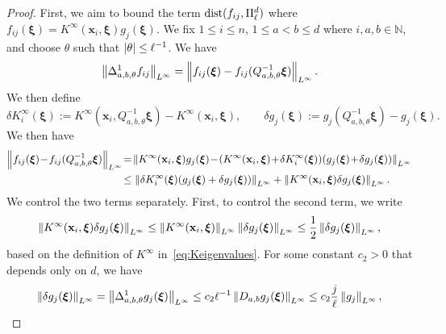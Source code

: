 \begin{proof}
First, we aim to bound the term $\text{dist}(f_{ij},\Pi^d_{\ell})$ where $f_{ij}(\boldsymbol{\xi}) = {K}^\infty(\mathbf{x}_i,\boldsymbol{\xi}) g_j(\boldsymbol{\xi})$. We fix $1 \leq i \leq n$, $1 \leq a < b \leq d$ where $i,a,b\in\mathbb{N}$, and choose $\theta$ such that $\left|\theta\right| \leq \ell^{-1}$. We have
\begin{equation*}
    \left\lVert\Delta^1_{a,b,\theta}f_{ij}\right\rVert_{L^\infty} = \left\lVert f_{ij}(\boldsymbol{\xi}) - f_{ij}(Q^{-1}_{a,b,\theta}\boldsymbol{\xi})\right\rVert_{L^\infty}.
\end{equation*}
We then define 
\begin{equation*}
    \delta {K}_i^\infty(\boldsymbol{\xi}) := {K}^\infty( \mathbf{x}_i,  Q^{-1}_{a,b,\theta}\boldsymbol{\xi}) - {K}^\infty(\mathbf{x}_i, \boldsymbol{\xi}), \qquad \delta g_j(\boldsymbol{\xi}) := g_j(Q^{-1}_{a,b,\theta}\boldsymbol{\xi}) - g_j(\boldsymbol{\xi}).
\end{equation*}
We then have
\begin{equation}\label{eq.controlDelta}
    \begin{aligned}
    \norm{f_{ij}(\boldsymbol{\xi}) \!-\! f_{ij}(Q^{-1}_{a,b,\theta}\boldsymbol{\xi})}_{L^\infty} \!&=\! \norm{{K}^\infty(\mathbf{x}_i, \boldsymbol{\xi}) g_j(\boldsymbol{\xi}) \!-\! ({K}^\infty(\mathbf{x}_i, \boldsymbol{\xi}) \!+\! \delta {K}_i^\infty(\boldsymbol{\xi})) (g_j(\boldsymbol{\xi}) \!+\! \delta g_j(\boldsymbol{\xi}))}_{L^\infty} \\
    &\leq \norm{\delta {K}_i^\infty(\boldsymbol{\xi}) (g_j(\boldsymbol{\xi}) + \delta g_j(\boldsymbol{\xi}))}_{L^\infty} + \norm{{K}^\infty(\mathbf{x}_i, \boldsymbol{\xi}) \delta g_j(\boldsymbol{\xi})}_{L^\infty}.
\end{aligned}
\end{equation}
We control the two terms separately. First, to control the second term, we write
\begin{equation}\label{eq.gterm}
    \left\lVert{K}^\infty(\mathbf{x}_i, \boldsymbol{\xi}) \delta g_j(\boldsymbol{\xi})\right\rVert_{L^\infty} \leq \left\lVert{K}^\infty(\mathbf{x}_i, \boldsymbol{\xi})\right\rVert_{L^\infty} \left\lVert\delta g_j(\boldsymbol{\xi})\right\rVert_{L^\infty} \leq \frac{1}{2}\left\lVert\delta g_j(\boldsymbol{\xi})\right\rVert_{L^\infty},
\end{equation}
based on the definition of ${K}^\infty$ in~\cref{eq:Keigenvalues}. For some constant $c_2 > 0$ that depends only on $d$, we have
\begin{equation}\label{eq.gterm2}
    \norm{\delta g_j(\boldsymbol{\xi})}_{L^\infty} = \norm{\Delta^1_{a,b,\theta} g_j(\boldsymbol{\xi})}_{L^\infty} \leq c_2 \ell^{-1} \norm{D_{a,b} g_j(\boldsymbol{\xi})}_{L^\infty} \leq c_2 \frac{j}{\ell} \norm{g_j}_{L^\infty},

\end{equation}
\end{proof}
